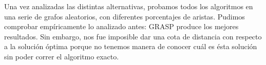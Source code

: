 Una vez analizadas las distintas alternativas, probamos todos los algoritmos en una serie de grafos aleatorios, con diferentes porcentajes de aristas. Pudimos comprobar empíricamente lo analizado antes: GRASP produce los mejores resultados. Sin embargo, nos fue imposible dar una cota de distancia con respecto a la solución óptima porque no tenemos manera de conocer cuál es ésta solución sin poder correr el algoritmo exacto. \\